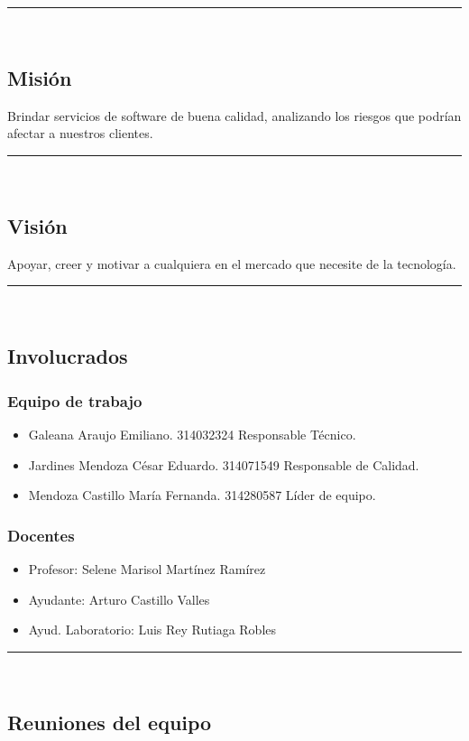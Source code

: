 \documentclass{article}
\begin{document}
\rule{0.8\textwidth}{.8pt}\\

\subsection*{Misión}
Brindar servicios de software de buena calidad, analizando los riesgos que
podrían afectar a nuestros clientes.

\rule{0.8\textwidth}{.8pt}\\

\subsection*{Visión}
Apoyar, creer y motivar a cualquiera en el mercado que necesite de la tecnología.


\rule{0.8\textwidth}{.8pt}\\

\subsection*{Involucrados}
\subsubsection*{Equipo de trabajo}
\begin{itemize}
\item Galeana Araujo Emiliano. 314032324 Responsable Técnico.
\item Jardines Mendoza César Eduardo. 314071549 Responsable de Calidad.
\item Mendoza Castillo María Fernanda. 314280587 Líder de equipo.
\end{itemize}

\subsubsection*{Docentes}
\begin{itemize}
\item Profesor: Selene Marisol Martínez Ramírez
\item Ayudante: Arturo Castillo Valles
\item Ayud. Laboratorio: Luis Rey Rutiaga Robles
\end{itemize}

\rule{0.8\textwidth}{.8pt}\\

\subsection*{Reuniones del equipo}
\end{document}
